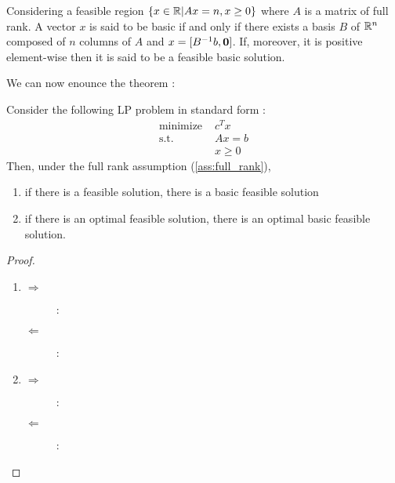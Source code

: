 \begin{definition}
    Considering a feasible region $\{x\in\mathbb R|Ax=n,x\ge 0\}$ where $A$ is a matrix of full rank.
    A vector $x$ is said to be basic if and only if there exists a basis $B$ of $\mathbb R^n$ composed of $n$ columns of $A$ and $x = [B^{-1}b, \textbf 0]$. If, moreover, it is positive element-wise then it is said to be a feasible basic solution. 
\end{definition}

We can now enounce the theorem :

\begin{theorem}
    Consider the following LP problem in standard form :
    \begin{align*}
        \textrm{minimize } & c^Tx\\
        \textrm{s.t. } & Ax = b\\
        & x \ge 0
    \end{align*}
    Then, under the full rank assumption (\ref{ass:full_rank}),
    \begin{enumerate}[label=(\roman*)]
        \item if there is a feasible solution, there is a basic feasible solution
        \item if there is an optimal feasible solution, there is an optimal basic feasible solution.
    \end{enumerate}
\end{theorem}
\begin{proof}\leavevmode
    \begin{enumerate}[label=(\roman*)]
        \item
        \begin{description}
            \item[$\Rightarrow$] :
            \item[$\Leftarrow$] : 
        \end{description}
        \item
        \begin{description}
            \item[$\Rightarrow$] :
            \item[$\Leftarrow$] : 
        \end{description}
    \end{enumerate}
\end{proof}

